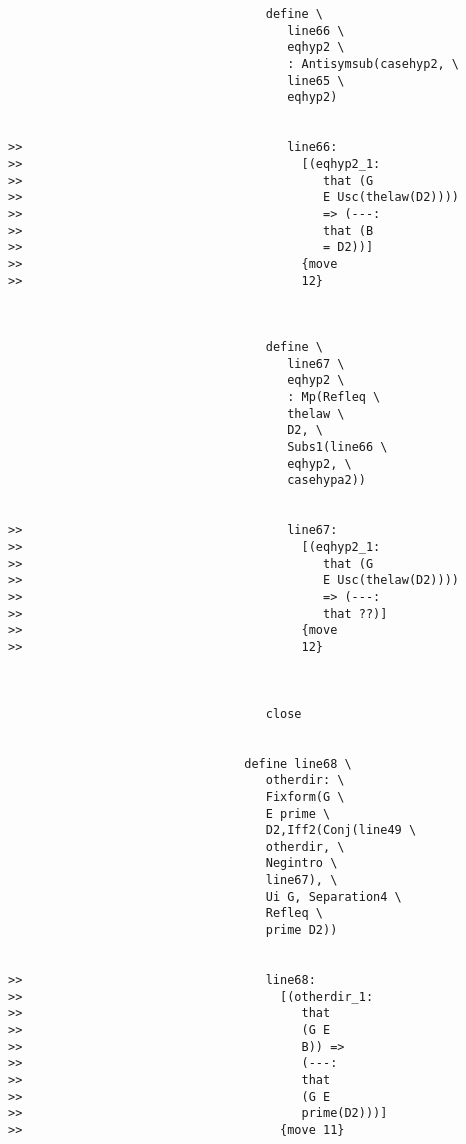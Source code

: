 \documentclass[12pt]{article}
\begin{document}
\begin{verbatim}
                                    define \
                                       line66 \
                                       eqhyp2 \
                                       : Antisymsub(casehyp2, \
                                       line65 \
                                       eqhyp2)


>>                                     line66:
>>                                       [(eqhyp2_1:
>>                                          that (G
>>                                          E Usc(thelaw(D2))))
>>                                          => (---:
>>                                          that (B
>>                                          = D2))]
>>                                       {move
>>                                       12}



                                    define \
                                       line67 \
                                       eqhyp2 \
                                       : Mp(Refleq \
                                       thelaw \
                                       D2, \
                                       Subs1(line66 \
                                       eqhyp2, \
                                       casehypa2))


>>                                     line67:
>>                                       [(eqhyp2_1:
>>                                          that (G
>>                                          E Usc(thelaw(D2))))
>>                                          => (---:
>>                                          that ??)]
>>                                       {move
>>                                       12}



                                    close


                                 define line68 \
                                    otherdir: \
                                    Fixform(G \
                                    E prime \
                                    D2,Iff2(Conj(line49 \
                                    otherdir, \
                                    Negintro \
                                    line67), \
                                    Ui G, Separation4 \
                                    Refleq \
                                    prime D2))


>>                                  line68:
>>                                    [(otherdir_1:
>>                                       that
>>                                       (G E
>>                                       B)) =>
>>                                       (---:
>>                                       that
>>                                       (G E
>>                                       prime(D2)))]
>>                                    {move 11}




\end{verbatim}
\end{document}
